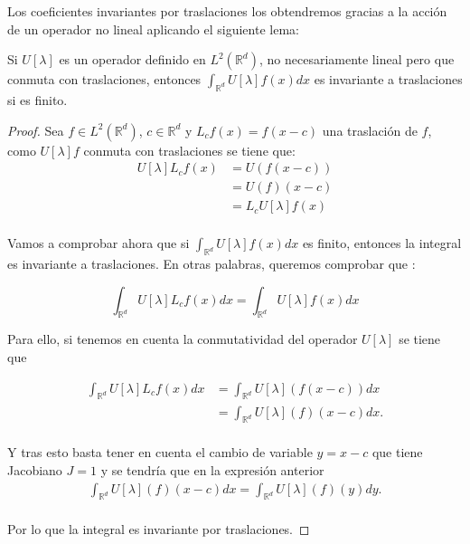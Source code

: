 \medskip 

\noindent Los coeficientes invariantes por traslaciones los obtendremos gracias a la acción de un operador no lineal aplicando el siguiente lema: 

\begin{lema} \label{lema:Invarianza_traslaciones_integral}
  Si $U[\lambda]$ es un operador definido en $L^2(\mathbb{R}^d)$, no necesariamente lineal pero que conmuta con traslaciones, entonces $\int_{\mathbb{R}^d} U[\lambda]f(x)dx$ es invariante a traslaciones si es finito.
\end{lema}

\begin{proof}
  Sea $f \in L^2(\mathbb{R}^d)$, $c \in \mathbb{R}^d$ y $L_cf(x)=f(x-c)$ una traslación de $f$, como $U[\lambda]f$ conmuta con traslaciones se tiene que: 
  \begin{align*}
    U[\lambda]L_cf(x)&=U(f(x-c)) \\
    &=U(f)(x-c) \\
    &=L_cU[\lambda]f(x)\\
  \end{align*}

  \noindent Vamos a comprobar ahora que si $\int_{\mathbb{R}^d} U[\lambda]f(x)dx$ es finito, entonces la integral es invariante a traslaciones. En otras palabras, queremos comprobar que : 

  $$\int_{\mathbb{R}^d} U[\lambda]L_cf(x)dx=\int_{\mathbb{R}^d} U[\lambda]f(x)dx$$

  Para ello, si tenemos en cuenta la conmutatividad del operador $U[\lambda]$ se tiene que 
  
  \begin{align*}
    \int_{\mathbb{R}^d} U[\lambda]L_cf(x)dx &= \int_{\mathbb{R}^d} U[\lambda](f(x-c))dx \\
    &= \int_{\mathbb{R}^d} U[\lambda](f)(x-c)dx. \\
  \end{align*}

  \noindent Y tras esto basta tener en cuenta el cambio de variable $y=x-c$ que tiene Jacobiano $J=1$ y se tendría que en la expresión anterior
  \begin{align*}
    \int_{\mathbb{R}^d} U[\lambda](f)(x-c)dx = \int_{\mathbb{R}^d} U[\lambda](f)(y)dy .\\
  \end{align*}
  
  \noindent Por lo que la integral es invariante por traslaciones.
\end{proof}

